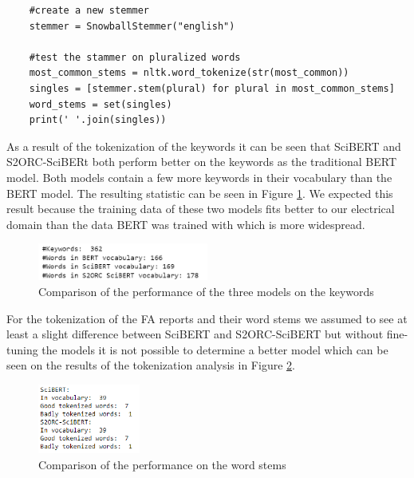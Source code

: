\begin{code}
	\label{code:stemming}
\begin{verbatim}
	#create a new stemmer
	stemmer = SnowballStemmer("english")
	
	#test the stammer on pluralized words
	most_common_stems = nltk.word_tokenize(str(most_common))
	singles = [stemmer.stem(plural) for plural in most_common_stems]
	word_stems = set(singles)
	print(' '.join(singles))
\end{verbatim}
\end{code}

As a result of the tokenization of the keywords it can be seen that SciBERT and S2ORC-SciBERt both perform better on the keywords as the traditional BERT model. Both models contain a few more keywords in their vocabulary than the BERT model. The resulting statistic can be seen in Figure \ref{fig:comparison}. We expected this result because the training data of these two models fits better to our electrical domain than the data BERT was trained with which is more widespread.


\begin{figure}[H]
	\centering
	\includegraphics[width=0.5\textwidth]{figures/keyword_comparison.PNG}
	\caption{Comparison of the performance of the three models on the keywords}
	\label{fig:comparison}
\end{figure}


For the tokenization of the FA reports and their word stems we assumed to see at least a slight difference between SciBERT and S2ORC-SciBERT but without fine-tuning the models it is not possible to determine a better model which can be seen on the results of the tokenization analysis in Figure \ref{fig:stemming_performance}.


\begin{figure}[H]
	\centering
	\includegraphics[width=0.3\textwidth]{figures/wordstems_comparison.PNG}
	\caption{Comparison of the performance on the word stems}
	\label{fig:stemming_performance}
\end{figure}


